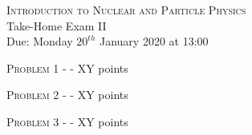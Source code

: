 \documentclass[a4paper,11pt]{report}
\begin{document}
\begin{center}
{\large \textsc{Introduction to Nuclear and Particle Physics}} \\[0.5cm]
\Large{Take-Home Exam II\\
Due: Monday $20^{th}$ January 2020 at 13:00}
\end{center}

{\large \textsc{Problem 1 - } - XY points}

\vspace{1cm}

{\large \textsc{Problem 2 - } - XY points}
\vspace{1cm}

{\large \textsc{Problem 3 - } - XY points}
\end{document}

